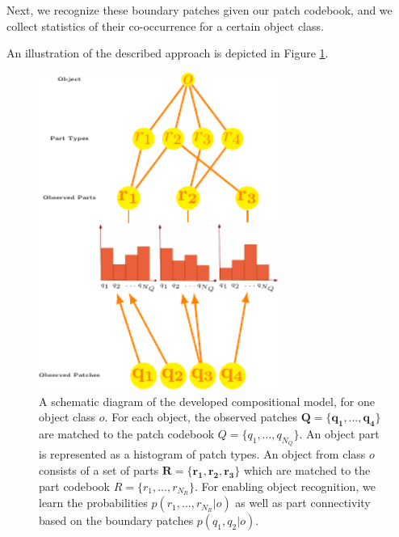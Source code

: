 \documentclass[a4paper,11pt,pdf]{pacmanreport}
\begin{document}
Next, we recognize these boundary patches given our patch codebook,
and we collect statistics of their co-occurrence for a certain object
class.

An illustration of the described approach is depicted in Figure \ref{fig:rel}.

\begin{figure}[h!]
\begin{center}
\includegraphics[width=0.7\textwidth]{rel.pdf}
\end{center}
\caption{A schematic diagram of the developed compositional model, for one object class $o$. For each object, the observed patches 
$\mathbf{Q}=\{\mathbf{q_1},\ldots,\mathbf{q_4}\}$ are matched to the patch 
codebook $Q=\{q_1,\ldots,q_{N_{Q}}\}$. An object part is represented as a 
histogram of patch types. An object from class $o$ consists of a set of parts 
$\mathbf{R}=\{\mathbf{r_1},\mathbf{r_2},\mathbf{r_3}\}$ which are matched to the 
part codebook $R=\{r_1,\ldots,r_{N_{R}}\}$. For enabling object recognition, we 
learn the probabilities $p(r_1,\ldots,r_{N_{R}} \vert o)$ as well as part 
connectivity based on the boundary patches $p(q_{1},q_{2} \vert o)$.} 
\label{fig:rel}
\end{figure}
\end{document}
